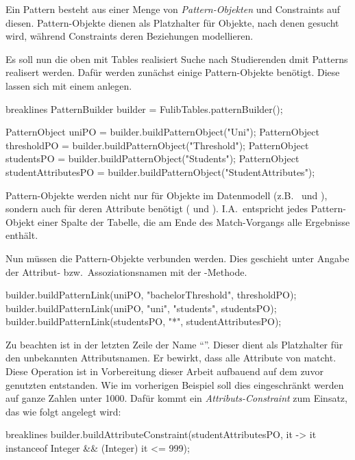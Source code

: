 Ein Pattern besteht aus einer Menge von \emph{Pattern-Objekten} und Constraints auf diesen.
Pattern-Objekte dienen als Platzhalter für Objekte, nach denen gesucht wird,
während Constraints deren Beziehungen modellieren.

Es soll nun die oben mit Tables realisiert Suche nach Studierenden dmit Patterns realisert werden.
Dafür werden zunächst einige Pattern-Objekte benötigt.
Diese lassen sich mit einem  anlegen.

\begin{jcodeblock*}{breaklines}
    PatternBuilder builder = FulibTables.patternBuilder();

    PatternObject uniPO = builder.buildPatternObject("Uni");
    PatternObject thresholdPO = builder.buildPatternObject("Threshold");
    PatternObject studentsPO = builder.buildPatternObject("Students");
    PatternObject studentAttributesPO = builder.buildPatternObject("StudentAttributes");
\end{jcodeblock*}

Pattern-Objekte werden nicht nur für Objekte im Datenmodell (z.B.\  und ),
sondern auch für deren Attribute benötigt ( und ).
I.A.\ entspricht jedes Pattern-Objekt einer Spalte der Tabelle, die am Ende des Match-Vorgangs alle Ergebnisse enthält.

Nun müssen die Pattern-Objekte verbunden werden.
Dies geschieht unter Angabe der Attribut- bzw.\ Assoziationsnamen mit der -Methode.

\begin{jcodeblock}
    builder.buildPatternLink(uniPO, "bachelorThreshold", thresholdPO);
    builder.buildPatternLink(uniPO, "uni", "students", studentsPO);
    builder.buildPatternLink(studentsPO, "*", studentAttributesPO);
\end{jcodeblock}

Zu beachten ist in der letzten Zeile der Name ``\code{*}''.
Dieser dient als Platzhalter für den unbekannten Attributsnamen.
Er bewirkt, dass  alle Attribute von  matcht.
Diese Operation ist in Vorbereitung dieser Arbeit aufbauend auf dem zuvor genutzten  entstanden.
Wie im vorherigen Beispiel soll dies eingeschränkt werden auf ganze Zahlen unter 1000.
Dafür kommt ein \emph{Attributs-Constraint} zum Einsatz, das wie folgt angelegt wird:

\begin{jcodeblock*}{breaklines}
    builder.buildAttributeConstraint(studentAttributesPO, it -> it instanceof Integer && (Integer) it <= 999);
\end{jcodeblock*}

